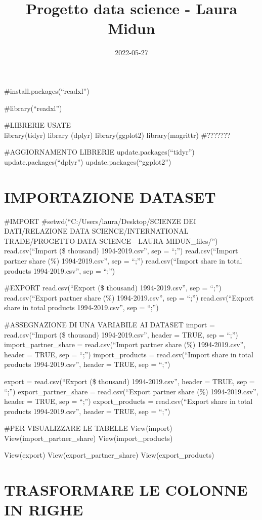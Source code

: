 \documentclass[
]{article}
\title{Progetto data science - Laura Midun}
\author{}
\date{\vspace{-2.5em}2022-05-27}
\begin{document}
\maketitle

\#install.packages(``readxl'')

\#library(``readxl'')

\#LIBRERIE USATE\\
library(tidyr) library (dplyr) library(ggplot2) library(magrittr)
\#???????

\#AGGIORNAMENTO LIBRERIE update.packages(``tidyr'')
update.packages(``dplyr'') update.packages(``ggplot2'')

\hypertarget{importazione-dataset}{%
\section{IMPORTAZIONE DATASET}\label{importazione-dataset}}

\#IMPORT \#setwd(``C:/Users/laura/Desktop/SCIENZE DEI DATI/RELAZIONE
DATA SCIENCE/INTERNATIONAL
TRADE/PROGETTO-DATA-SCIENCE---LAURA-MIDUN\_files/'') read.csv(``Import
(\$ thousand) 1994-2019.csv'', sep = ``;'') read.csv(``Import partner
share (\%) 1994-2019.csv'', sep = ``;'') read.csv(``Import share in
total products 1994-2019.csv'', sep = ``;'')

\#EXPORT read.csv(``Export (\$ thousand) 1994-2019.csv'', sep = ``;'')
read.csv(``Export partner share (\%) 1994-2019.csv'', sep = ``;'')
read.csv(``Export share in total products 1994-2019.csv'', sep = ``;'')

\#ASSEGNAZIONE DI UNA VARIABILE AI DATASET import = read.csv(``Import
(\$ thousand) 1994-2019.csv'', header = TRUE, sep = ``;'')
import\_partner\_share = read.csv(``Import partner share (\%)
1994-2019.csv'', header = TRUE, sep = ``;'') import\_products =
read.csv(``Import share in total products 1994-2019.csv'', header =
TRUE, sep = ``;'')

export = read.csv(``Export (\$ thousand) 1994-2019.csv'', header = TRUE,
sep = ``;'') export\_partner\_share = read.csv(``Export partner share
(\%) 1994-2019.csv'', header = TRUE, sep = ``;'') export\_products =
read.csv(``Export share in total products 1994-2019.csv'', header =
TRUE, sep = ``;'')

\#PER VISUALIZZARE LE TABELLE View(import) View(import\_partner\_share)
View(import\_products)

View(export) View(export\_partner\_share) View(export\_products)

\hypertarget{trasformare-le-colonne-in-righe}{%
\section{TRASFORMARE LE COLONNE IN
RIGHE}\label{trasformare-le-colonne-in-righe}}
\end{document}
